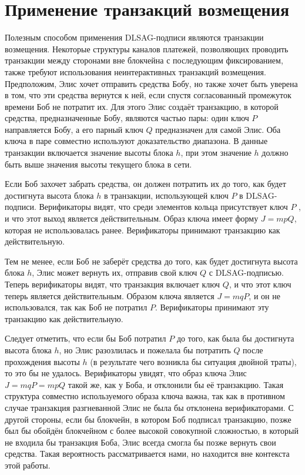 \documentclass{mrl}
\begin{document}
\section{Применение транзакций возмещения}
Полезным способом применения DLSAG-подписи являются транзакции возмещения. Некоторые структуры каналов платежей, позволяющих проводить транзакции между сторонами вне блокчейна с последующим фиксированием, также требуют использования неинтерактивных транзакций возмеще\-ния. Предположим, Элис хочет отправить средства Бобу, но также хочет быть уверена в том, что эти средства вернутся к ней, если спустя согласованный промежуток времени Боб не потратит их. Для этого Элис создаёт транзакцию, в которой средства, предназначенные Бобу, являются частью пары: один ключ $P$ направляется Бобу, а его парный ключ $Q$ предназначен для самой Элис. Оба ключа в паре совместно используют доказательство диапазона. В данные транзакции включается значение высоты блока $h$, при этом значение $h$ должно быть выше значения высоты текущего блока в сети.

Если Боб захочет забрать средства, он должен потратить их до того, как будет достигнута высота блока $h$ в транзакции, использующей ключ $P$ в DLSAG-подписи. Верификаторы видят, что среди элементов кольца присутствует ключ $P$ , и что этот выход является действительным. Образ ключа имеет форму $J = mpQ$, которая не использовалась ранее. Верификаторы принимают транзакцию как действительную.

Тем не менее, если Боб не заберёт средства до того, как будет достигнута высота блока $h$, Элис может вернуть их, отправив свой ключ $Q$ с DLSAG-подписью. Теперь верификаторы видят, что транзакция включает ключ $Q$, и что этот ключ теперь является действительным. Образом ключа является $J = mqP$, и он не использовался, так как Боб не потратил $P$. Верификаторы принимают эту транзакцию как действительную.

Следует отметить, что если бы Боб потратил $P$ до того, как была бы достигнута высота блока $h$, но Элис разозлилась и пожелала бы потратить $Q$ после прохождения высоты $h$ (в результате чего возникла бы ситуация двойной траты), то это бы не удалось. Верификаторы увидят, что образ ключа Элис $J = mqP = mpQ$ такой же, как у Боба, и отклонили бы её транзакцию. Такая структура совместно используемого образа ключа важна, так как в противном случае транзакция разгневанной Элис не была бы отклонена верификаторами. С другой стороны, если бы блокчейн, в котором Боб подписал транзакцию, позже был бы обойдён блокчейном с более высокой совокупной сложностью, в который не входила бы транзакция Боба, Элис всегда смогла бы позже вернуть свои средства. Такая вероятность рассматривается нами, но находится вне контекста этой работы.
\end{document}
